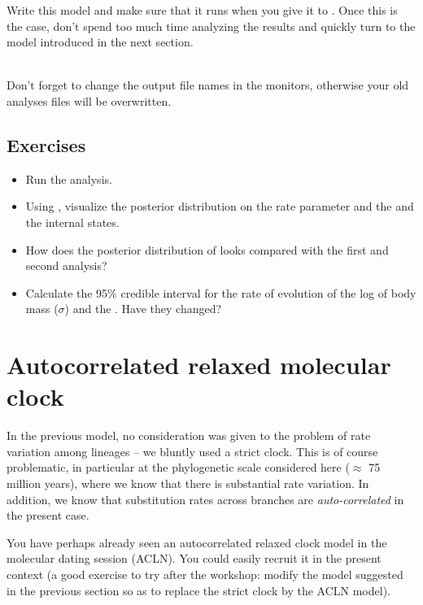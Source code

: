 Write this model and make sure that it runs when you give it to . Once this is the case, don't spend too much time analyzing the results and quickly turn to the model introduced in the next section.


\noindent \\ \impmark Don't forget to change the output file names in the monitors, otherwise your old analyses files will be overwritten.


\subsection*{Exercises}

\begin{itemize}
\item
Run the analysis.
\item
Using , visualize the posterior distribution on the rate parameter  and the  and the internal states.
\item 
How does the posterior distribution of  looks compared with the first and second analysis?
\item
Calculate the 95\% credible interval for the rate of evolution of the log of body mass ($\sigma$) and the . Have they changed?
\end{itemize}

\vspace{5cm}





\section{Autocorrelated relaxed molecular clock}

In the previous model, no consideration was given to the problem of rate variation among lineages --
we bluntly used a strict clock. This is of course problematic, in particular at the phylogenetic scale considered here ($\approx$ 75 million years), where we know that there is substantial rate variation. In addition, we know that substitution rates across branches are \emph{auto-correlated} in the present case.

You have perhaps already seen an autocorrelated relaxed clock model in the molecular dating session (ACLN). You could easily recruit it in the present context (a good exercise to try after the workshop: modify the model suggested in the previous section so as to replace the strict clock by the ACLN model).

